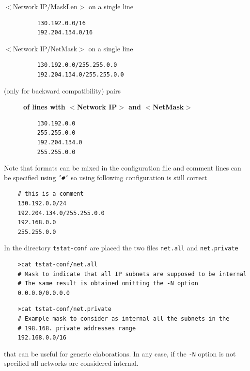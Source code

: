 \documentclass[11pt]{article}
\begin{document}
\begin{description}

\item[{$<$Network IP/MaskLen$>$ on a single line}] \mbox{}\begin{small}\begin{verbatim}
    130.192.0.0/16
    192.204.134.0/16
\end{verbatim}\end{small} \noindent
\item[{$<$Network IP/NetMask$>$ on a single line}] \mbox{}\begin{small}\begin{verbatim}
    130.192.0.0/255.255.0.0
    192.204.134.0/255.255.0.0
\end{verbatim}\end{small} \noindent
\item[{(only for backward compatibility) pairs}] \textbf{of lines with $<$Network IP$>$ and $<$NetMask$>$}\begin{small}\begin{verbatim}
    130.192.0.0
    255.255.0.0
    192.204.134.0
    255.255.0.0
\end{verbatim}\end{small} \noindent
\end{description}


Note that formats can be mixed in the configuration file and comment lines
can be specified using \texttt{'\#'} so using following
configuration is still correct

\begin{small}\begin{verbatim}
    # this is a comment
    130.192.0.0/24
    192.204.134.0/255.255.0.0
    192.168.0.0
    255.255.0.0
\end{verbatim}\end{small} \noindent
In the directory \texttt{tstat-conf} are placed the two files \texttt{net.all} and
\texttt{net.private}

\begin{small}\begin{verbatim}
    >cat tstat-conf/net.all
    # Mask to indicate that all IP subnets are supposed to be internal
    # The same result is obtained omitting the -N option
    0.0.0.0/0.0.0.0
\end{verbatim}\end{small} \noindent
\begin{small}\begin{verbatim}
    >cat tstat-conf/net.private
    # Example mask to consider as internal all the subnets in the 
    # 198.168. private addresses range
    192.168.0.0/16
\end{verbatim}\end{small} \noindent
that can be useful for generic elaborations. In any case, if the \texttt{-N} option
is not specified all networks are considered internal.
\end{document}
